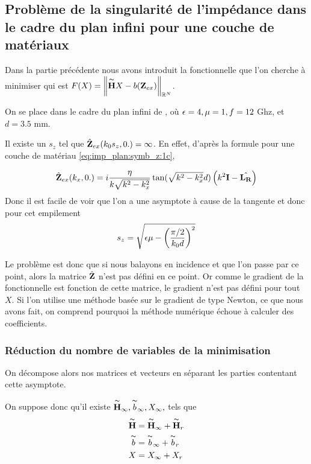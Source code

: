 \subsection{Problème de la singularité de l'impédance dans le cadre du plan infini pour une couche de matériaux}

Dans la partie précédente nous avons introduit la fonctionnelle que l'on cherche à minimiser qui est \(F(X) = \left\lVert\overset{\thicksim}{\mathbf{H}} X - b(\mathbf{Z}_{ex})\right\rVert_{\mathbb R^N}\).

On se place dans le cadre du plan infini de \cite{aubakirov_electromagnetic_2014}, où \(\epsilon=4,\mu=1,f=12\) Ghz, et \(d=3.5\) mm. %

Il existe un \(s_z\) tel que \(\hat{\mathbf{Z}}_{ex}(k_0s_z,0.) = \infty\). En effet, d'après la formule pour une couche de matériau \eqref{eq:imp_plan:symb_z:1c}, 

\begin{equation}
  \hat{\mathbf{Z}}_{ex}(k_x,0.) = i\dfrac{\eta}{k\sqrt{k^2 - k_x^2}}\tan(\sqrt{k^2 - k_x^2}d)\left(k^2\mathbf{I} - \hat{\mathbf{L_R}}\right)
\end{equation}
Donc il est facile de voir que l'on a une asymptote à cause de la tangente et donc pour cet empilement
\begin{equation}
  s_z = \sqrt{\epsilon \mu - \left(\dfrac{\pi/2}{k_0 d}\right)^2}
\end{equation}

Le problème est donc que si nous balayons en incidence et que l'on passe par ce point, alors la matrice \(\hat{\mathbf{Z}}\) n'est pas défini en ce point. Or comme le gradient de la fonctionnelle est fonction de cette matrice, le gradient n'est pas défini pour tout \(X\). Si l'on utilise une méthode basée sur le gradient de type Newton, ce que nous avons fait, on comprend pourquoi la méthode numérique échoue à calculer des coefficients.

\subsubsection{Réduction du nombre de variables de la minimisation}

On décompose alors nos matrices et vecteurs en séparant les parties contentant cette asymptote.

On suppose donc qu'il existe \(\overset{\thicksim}{\mathbf{H}}_\infty, \overset{\thicksim}{b}_\infty, X_\infty,\) tels que
\begin{align*}
  \overset{\thicksim}{\mathbf{H}} &= \overset{\thicksim}{\mathbf{H}}_\infty + \overset{\thicksim}{\mathbf{H}}_r
  \\
  \overset{\thicksim}{b} &= \overset{\thicksim}{b}_\infty + \overset{\thicksim}{b}_r
  \\
  X &= X_\infty + X_r
\end{align*}

